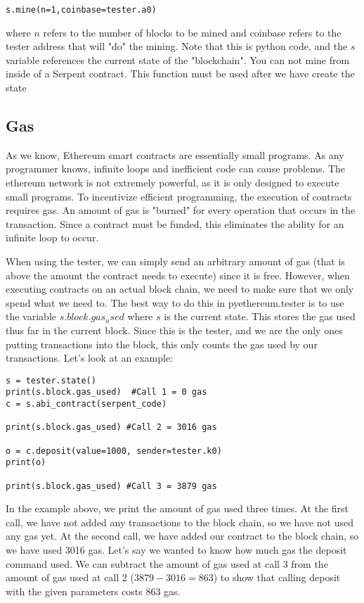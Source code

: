 \documentclass[12pt]{article}
\begin{document}
\begin{verbatim}
s.mine(n=1,coinbase=tester.a0)
\end{verbatim}

where $n$ refers to the number of blocks to be mined and coinbase refers to the tester address that will "do" the mining. Note that this is python code, and the $s$ variable references the current state of the "blockchain". You can not mine from inside of a Serpent contract. This function must be used after we have create the state \cite{Usingpyethereum.tester}

\subsection{Gas}
As we know, Ethereum smart contracts are essentially small programs. As any programmer knows, infinite loops and inefficient code can cause problems. The ethereum network is not extremely powerful, as it is only designed to execute small programs. To incentivize efficient programming, the execution of contracts requires gas. An amount of gas is "burned" for every operation that occurs in the transaction. Since a contract must be funded, this eliminates the ability for an infinite loop to occur.

When using the tester, we can simply send an arbitrary amount of gas (that is above the amount the contract needs to execute) since it is free. However, when executing contracts on an actual block chain, we need to make sure that we only spend what we need to. The best way to do this in pyethereum.tester is to use the variable $s.block.gas_used$ where $s$ is the current state. This stores the gas used thus far in the current block. Since this is the tester, and we are the only ones putting transactions into the block, this only counts the gas used by our transactions. Let's look at an example:

\begin{verbatim}
s = tester.state()
print(s.block.gas_used)  #Call 1 = 0 gas
c = s.abi_contract(serpent_code)

print(s.block.gas_used) #Call 2 = 3016 gas

o = c.deposit(value=1000, sender=tester.k0)
print(o)

print(s.block.gas_used) #Call 3 = 3879 gas
\end{verbatim}

In the example above, we print the amount of gas used three times. At the first call, we have not added any transactions to the block chain, so we have not used any gas yet. At the second call, we have added our contract to the block chain, so we have used 3016 gas. Let's say we wanted to know how much gas the deposit command used. We can subtract the amount of gas used at call 3 from the amount of gas used at call 2 ($3879-3016 = 863$) to show that calling deposit with the given parameters costs 863 gas. 
\end{document}
